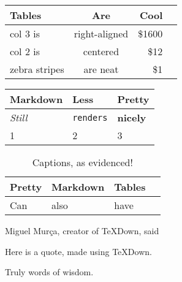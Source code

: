 \documentclass{article}
\begin{document}
\vspace{5mm}

\begin{table}[h!]
\begingroup
\setlength{\tabcolsep}{10pt}
\renewcommand{\arraystretch}{1.5}
\begin{tabular}{ |l|c|r|l| }
\hline
Tables & Are & Cool \\ \hline \hline
col 3 is & right-aligned & \$1600 \\ \hline
col 2 is & centered & \$12 \\ \hline
zebra stripes & are neat & \$1 \\ \hline
\end{tabular}
\label{table0}
\endgroup
\end{table}

\vspace{5mm}

\begin{table}[h!]
\begingroup
\setlength{\tabcolsep}{10pt}
\renewcommand{\arraystretch}{1.5}
\begin{tabular}{ |l|l|l| }
\hline
Markdown & Less & Pretty \\ \hline \hline
\emph{Still} & \lstinline[columns=fixed]$renders$ & \textbf{nicely} \\ \hline
1 & 2 & 3 \\ \hline
\end{tabular}
\label{table2}
\endgroup
\end{table}

\begin{table}[h!]
\begingroup
\setlength{\tabcolsep}{10pt}
\renewcommand{\arraystretch}{1.5}
\begin{tabular}{ |l|l|l|l| }
\hline
Pretty & Markdown & Tables \\ \hline \hline
Can & also & have \\ \hline
\end{tabular}
\label{table1}
\caption{Captions, as evidenced!}
\endgroup
\end{table}

\vspace{5mm}

Miguel Murça, creator of TeXDown, said
\begin{displayquote}
Here is a quote,
made using TeXDown.
\end{displayquote}
Truly words of wisdom.
\end{document}
